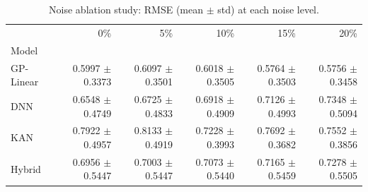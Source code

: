 \begin{table}[ht]
\caption{Noise ablation study: RMSE (mean $\pm$ std) at each noise level.}
\label{tab:noise_ablation}
\begin{tabular}{lrrrrr}
\toprule
 & 0\% & 5\% & 10\% & 15\% & 20\% \\
Model &  &  &  &  &  \\
\midrule
GP-Linear & 0.5997 $\pm$ 0.3373 & 0.6097 $\pm$ 0.3501 & 0.6018 $\pm$ 0.3505 & 0.5764 $\pm$ 0.3503 & 0.5756 $\pm$ 0.3458 \\
DNN & 0.6548 $\pm$ 0.4749 & 0.6725 $\pm$ 0.4833 & 0.6918 $\pm$ 0.4909 & 0.7126 $\pm$ 0.4993 & 0.7348 $\pm$ 0.5094 \\
KAN & 0.7922 $\pm$ 0.4957 & 0.8133 $\pm$ 0.4919 & 0.7228 $\pm$ 0.3993 & 0.7692 $\pm$ 0.3682 & 0.7552 $\pm$ 0.3856 \\
Hybrid & 0.6956 $\pm$ 0.5447 & 0.7003 $\pm$ 0.5447 & 0.7073 $\pm$ 0.5440 & 0.7165 $\pm$ 0.5459 & 0.7278 $\pm$ 0.5505 \\
\bottomrule
\end{tabular}
\end{table}
